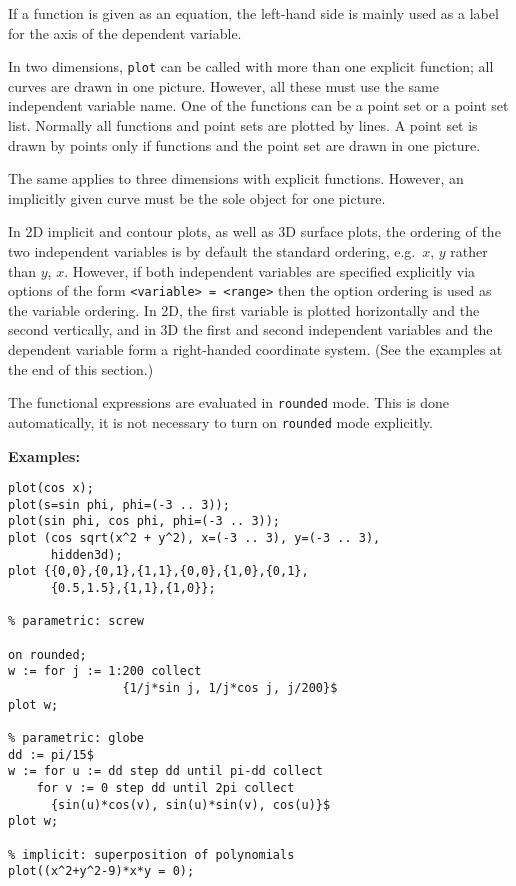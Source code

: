 If a function is given as an equation, the left-hand side is mainly used as a
label for the axis of the dependent variable.

In two dimensions, \texttt{plot} can be called with more than one explicit
function; all curves are drawn in one picture. However, all these must use the
same independent variable name.  One of the functions can be a point set or a
point set list.  Normally all functions and point sets are plotted by lines. A
point set is drawn by points only if functions and the point set are drawn in
one picture.

The same applies to three dimensions with explicit functions. However, an
implicitly given curve must be the sole object for one picture.

In 2D implicit and contour plots, as well as 3D surface plots, the
ordering of the two independent variables is by default the standard
{\REDUCE} ordering, e.g.\ $x$, $y$ rather than $y$, $x$.  However, if
both independent variables are specified explicitly via options of the
form \texttt{<variable> = <range>} then the option ordering is used as
the variable ordering.  In 2D, the first variable is plotted
horizontally and the second vertically, and in 3D the first and second
independent variables and the dependent variable form a right-handed
coordinate system.  (See the examples at the end of this section.)

The functional expressions are evaluated in \texttt{rounded} mode.
This is done automatically, it is not necessary to turn on
\texttt{rounded} mode explicitly.

\textbf{Examples:}
\begin{verbatim}
plot(cos x);
plot(s=sin phi, phi=(-3 .. 3));
plot(sin phi, cos phi, phi=(-3 .. 3));
plot (cos sqrt(x^2 + y^2), x=(-3 .. 3), y=(-3 .. 3),
      hidden3d);
plot {{0,0},{0,1},{1,1},{0,0},{1,0},{0,1},
      {0.5,1.5},{1,1},{1,0}};

% parametric: screw

on rounded;
w := for j := 1:200 collect
                {1/j*sin j, 1/j*cos j, j/200}$
plot w;

% parametric: globe
dd := pi/15$
w := for u := dd step dd until pi-dd collect
    for v := 0 step dd until 2pi collect
      {sin(u)*cos(v), sin(u)*sin(v), cos(u)}$
plot w;

% implicit: superposition of polynomials
plot((x^2+y^2-9)*x*y = 0);
\end{verbatim}


